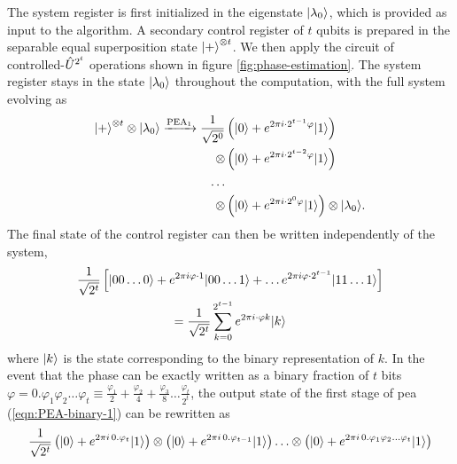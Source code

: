 The system register is first initialized in the eigenstate $\mbox{$ | \lambda_0 \rangle $}$, which is provided as input to the algorithm. A secondary control register of $t$ qubits is prepared in the separable equal superposition state $\mbox{$ | + \rangle $}^{\otimes t}$. We then apply the circuit of controlled-$\hat{U}^{2^t}$ operations shown in figure \ref{fig:phase-estimation}. The system register stays in the state $\mbox{$ | \lambda_0 \rangle $}$ throughout the computation, with the full system evolving as
\begin{align}
\begin{split}
    \mbox{$ | + \rangle $}^{\otimes t} \otimes \mbox{$ | \lambda_0 \rangle $} \xrightarrow{\mathrm{PEA_1}} \frac{1}{\sqrt{2^0}} 
    &\left( \mbox{$ | 0 \rangle $} + e^{2\pi i \cdot 2^{t-1} \varphi} \mbox{$ | 1 \rangle $}\right) \\
    \otimes &\left( \mbox{$ | 0 \rangle $} + e^{2\pi i \cdot 2^{t-2} \varphi} \mbox{$ | 1 \rangle $}\right)\\
    \ldots &\\
    \otimes &\left( \mbox{$ | 0 \rangle $} + e^{2\pi i \cdot 2^{0} \varphi} \mbox{$ | 1 \rangle $}\right) \otimes \mbox{$ | \lambda_0 \rangle $}.
\end{split}
    \label{eqn:PEA-binary-1}
\end{align}
The final state of the control register can then be written independently of the system, 
\begin{gather}
    \frac{1}{\sqrt{2^t}} \left[
    \mbox{$ | 00\ldots0 \rangle $} +
    e^{2\pi i \varphi \cdot 1 } \mbox{$ | 00\ldots1 \rangle $} +
    \ldots
    e^{2\pi i \varphi \cdot 2^{t-1} } \mbox{$ | 11\ldots1 \rangle $} 
    \right]\\
    =
    \frac{1}{\sqrt{2^t}} \sum_{k=0}^{2^{t-1}} e ^ {2\pi i \cdot \varphi k } \mbox{$ | k \rangle $} 
    \label{eqn:PEA-binary-2}
\end{gather}
where $\mbox{$ | k \rangle $}$ is the state corresponding to the binary representation of $k$.  In the event that the phase can be exactly written as a binary fraction of $t$ bits $\varphi = 0.\varphi_1 \varphi_2 \ldots \varphi_t \equiv \frac{\varphi_1}{2} + \frac{\varphi_2}{4} + \frac{\varphi_3}{8} \ldots \frac{\varphi_t}{2^t}$, the output state of the first stage of \gls{pea} (\ref{eqn:PEA-binary-1}) can be rewritten as
\begin{equation}
    \frac{1}{\sqrt{2^t}} 
    \left( \mbox{$ | 0 \rangle $} + e^{2\pi i \, 0.\varphi_t} \mbox{$ | 1 \rangle $}\right) 
    \otimes \left( \mbox{$ | 0 \rangle $} + e^{2\pi i \, 0.\varphi_{t-1}} \mbox{$ | 1 \rangle $}\right)
    \ldots 
    \otimes \left( \mbox{$ | 0 \rangle $} + e^{2\pi i \, 0.\varphi_{1}\varphi_{2}\ldots \varphi_t} \mbox{$ | 1 \rangle $}\right) 
    \label{eqn:chemistry-digital-phase}
\end{equation}
